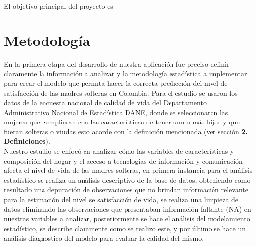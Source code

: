 \documentclass[11pt,twoside]{article}
\begin{document}


El objetivo principal del proyecto es 





\section{Metodología}
\noindent
En la primera etapa del desarrollo de nuestra aplicación fue preciso definir claramente la información a analizar y la metodología estadística a implementar para crear el modelo que permita hacer la correcta predicción del nivel de satisfacción de las madres solteras en Colombia. Para el estudio se usaron los datos de la encuesta nacional de calidad de vida del Departamento Administrativo Nacional de Estadística DANE, donde se seleccionaron las mujeres que cumplieran con las características de tener uno o más hijos y que fueran solteras o viudas esto acorde con la definición mencionada (ver sección \textbf{2. Definiciones}).
\\
Nuestro estudio se enfocó en analizar cómo las variables de características y composición del hogar y el acceso a tecnologías de información y comunicación afecta el nivel de vida de las madres solteras, en primera instancia para el análisis estadístico se realiza un análisis descriptivo de la base de datos, obteniendo como resultado una depuración de observaciones que no brindan información relevante para la estimación del nivel se satisfacción de vida, se realiza una limpieza de datos eliminando las observaciones que presentaban información faltante (NA) en nuestras variables a analizar, posteriormente se hace el análisis del modelamiento estadístico, se describe claramente como se realizo este, y por último se hace un análisis diagnostico del modelo para evaluar la calidad del mismo. 
\\
\end{document}
